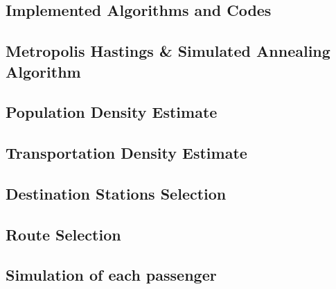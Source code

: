 \documentclass{mcmthesis}
\begin{document}
\begin{appendices}
\newpage
\section{Implemented Algorithms and Codes}
\subsection{Metropolis Hastings \& Simulated Annealing Algorithm}


\subsection{Population Density Estimate}


\subsection{Transportation Density Estimate}


\subsection{Destination Stations Selection}


\subsection{Route Selection}


\subsection{Simulation of each passenger}

\end{appendices}
\end{document}
